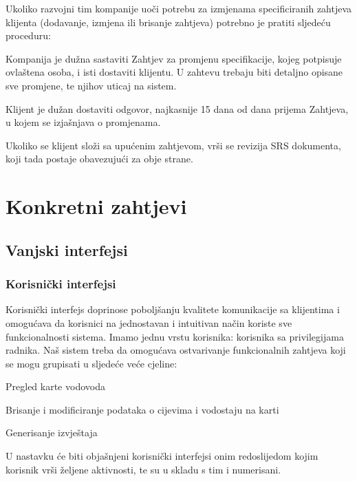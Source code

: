 \documentclass[]{report}
\begin{document}
\vspace*{0.25cm}
\noindent
Ukoliko razvojni tim kompanije uoči potrebu za izmjenama specificiranih zahtjeva klijenta (dodavanje, izmjena ili brisanje zahtjeva) potrebno je pratiti sljedeću proceduru: 
\begin{compactitem}
\item Kompanija je dužna sastaviti Zahtjev za promjenu specifikacije, kojeg potpisuje ovlaštena osoba, i isti dostaviti klijentu. U          zahtevu trebaju biti detaljno opisane sve promjene, te njihov uticaj na sistem. 
\item Klijent je dužan dostaviti odgovor, najkasnije 15 dana od dana prijema Zahtjeva, u kojem se izjašnjava o promjenama. 
\item Ukoliko se klijent složi sa upućenim zahtjevom, vrši se revizija SRS dokumenta, koji tada postaje obavezujući za obje strane.
\end{compactitem}

\chapter{Konkretni zahtjevi}
\section{Vanjski interfejsi}

\subsection{Korisnički interfejsi}
Korisnički interfejs doprinose poboljšanju kvalitete komunikacije sa klijentima i omogućava da korisnici na jednostavan i intuitivan način koriste sve funkcionalnosti sistema. Imamo jednu vrstu korisnika: korisnika sa privilegijama radnika. Naš sistem treba da omogućava  ostvarivanje funkcionalnih zahtjeva koji se mogu grupisati u sljedeće veće cjeline: 
\begin{compactitem}
\item  Pregled karte vodovoda
\item Brisanje i modificiranje podataka o cijevima i vodostaju na karti
\item Generisanje izvještaja 
\end{compactitem}
 U nastavku će biti objašnjeni korisnički interfejsi onim redoslijedom kojim korisnik vrši željene aktivnosti, te su u skladu s tim i numerisani.
\end{document}
